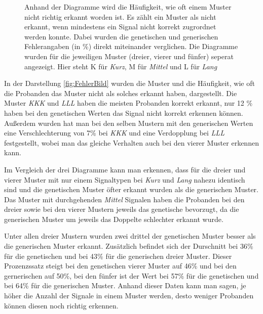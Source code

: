 \begin{figure}[htbp]
\begin{minipage}[t]{0.4\textwidth}
	\end{minipage}
	\caption{Anhand der Diagramme wird die H{\"a}ufigkeit, wie oft einem Muster nicht richtig erkannt worden ist. Es z{\"a}hlt ein Muster als nicht erkannt, wenn mindestens ein Signal nicht korrekt zugrordnet werden konnte.   
	Dabei wurden die genetischen und generischen Fehlerangaben (in \%) direkt miteinander verglichen. 
	Die Diagramme wurden f{\"u}r die jeweiligen Muster (dreier, vierer und f{\"u}nfer) seperat angezeigt.
	Hier steht K f{\"u}r \textit{Kurz}, M f{\"u}r \textit{Mittel} und L f{\"u}r \textit{Lang}}
	\label{fig:FehlerBild}
\end{figure}
 
In der Darstellung \autoref{fig:FehlerBild} wurden die Muster und die H{\"a}ufigkeit, wie oft die Probanden das Muster nicht als solches erkannt haben, dargestellt. 
Die Muster \textit{KKK} und \textit{LLL} haben die meisten Probanden korrekt erkannt, nur 12 \% haben bei den genetischen Werten das Signal nicht korrekt erkennen k{\"o}nnen. 
Au{\ss}erdem wurden hat man bei den selben Mustern mit den generischen Werten eine Verschlechterung von 7\% bei \textit{KKK} und eine Verdopplung bei \textit{LLL} festgestellt, wobei man das gleiche Verhalten auch bei den vierer Muster erkennen kann.

Im Vergleich der drei Diagramme kann man erkennen, dass f{\"u}r die dreier und vierer Muster mit nur einem Signaltypen bei \textit{Kurz} und \textit{Lang} nahezu identisch sind und die genetischen Muster {\"o}fter erkannt wurden als die generischen Muster. 
Das Muster mit durchgehenden \textit{Mittel} Signalen haben die Probanden bei den dreier sowie bei den vierer Mustern jeweils das genetische bevorzugt, da die generischen Muster um jeweils das Doppelte schlechter erkannt wurde. 

Unter allen dreier Mustern wurden zwei drittel der genetischen Muster besser als die generischen Muster erkannt. 
Zus{\"a}tzlich befindet sich der Durschnitt bei 36\% f{\"u}r die genetischen und bei 43\% f{\"u}r die generischen dreier Muster.
Dieser Prozenzssatz steigt bei den genetischen vierer Muster auf 46\% und bei den gernerischen auf 50\%, bei den f{\"u}nfer ist der Wert bei 57\% f{\"u}r die genetischen und bei 64\% f{\"u}r die generischen Muster. 
Anhand dieser Daten kann man sagen, je h{\"o}her die Anzahl der Signale in einem Muster werden, desto weniger Probanden k{\"o}nnen diesen noch richtig erkennen.

